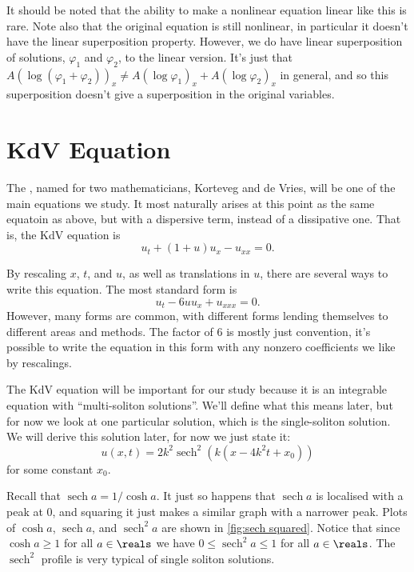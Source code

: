 \documentclass[fleqn]{NotesClass}
\DeclareMathOperator{\sech}{sech}
\begin{document}
    It should be noted that the ability to make a nonlinear equation linear like this is rare.
    Note also that the original equation is still nonlinear, in particular it doesn't have the linear superposition property.
    However, we do have linear superposition of solutions, \(\varphi_1\) and \(\varphi_2\), to the linear version.
    It's just that \(A(\log(\varphi_1 + \varphi_2))_x \ne A(\log \varphi_1)_x + A(\log \varphi_2)_x\) in general, and so this superposition doesn't give a superposition in the original variables.
    
    \section{KdV Equation}
    The , named for two mathematicians, Korteveg and de Vries, will be one of the main equations we study.
    It most naturally arises at this point as the same equatoin as above, but with a dispersive term, instead of a dissipative one.
    That is, the KdV equation is
    \begin{equation}
        u_t + (1 + u) u_x - u_{xx} = 0.
    \end{equation}
    
    By rescaling \(x\), \(t\), and \(u\), as well as translations in \(u\), there are several ways to write this equation.
    The most standard form is
    \begin{equation}
        u_t - 6uu_x + u_{xxx} = 0.
    \end{equation}
    However, many forms are common, with different forms lending themselves to different areas and methods.
    The factor of \(6\) is mostly just convention, it's possible to write the equation in this form with any nonzero coefficients we like by rescalings.
    
    The KdV equation will be important for our study because it is an integrable equation with \enquote{multi-soliton solutions}.
    We'll define what this means later, but for now we look at one particular solution, which is the single-soliton solution.
    We will derive this solution later, for now we just state it:
    \begin{equation}
        u(x, t) = 2k^2 \sech^2(k(x - 4k^2 t + x_0))
    \end{equation}
    for some constant \(x_0\).
    
    Recall that \(\sech a = 1/\cosh a\).
    It just so happens that \(\sech a\) is localised with a peak at \(0\), and squaring it just makes a similar graph with a narrower peak.
    Plots of \(\cosh a\), \(\sech a\), and \(\sech^2 a\) are shown in \cref{fig:sech squared}.
    Notice that since \(\cosh a \ge 1\) for all \(a \in \reals\) we have \(0 \le \sech^2a \le 1\) for all \(a \in \reals\).
    The \(\sech^2\) profile is very typical of single soliton solutions.
    
\end{document}

